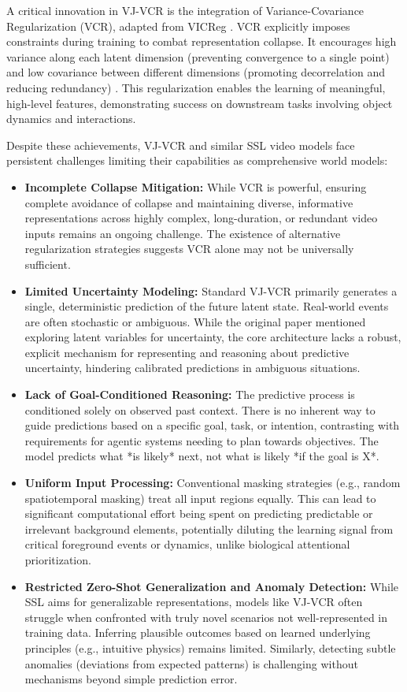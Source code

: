 \documentclass[11pt]{article}
\begin{document}
A critical innovation in VJ-VCR is the integration of Variance-Covariance Regularization (VCR), adapted from VICReg \cite{Bardes2021}. VCR explicitly imposes constraints during training to combat representation collapse. It encourages high variance along each latent dimension (preventing convergence to a single point) and low covariance between different dimensions (promoting decorrelation and reducing redundancy) \cite{Bardes2022, Zhu2023}. This regularization enables the learning of meaningful, high-level features, demonstrating success on downstream tasks involving object dynamics and interactions.

Despite these achievements, VJ-VCR and similar SSL video models face persistent challenges limiting their capabilities as comprehensive world models:
\begin{itemize}
    \item \textbf{Incomplete Collapse Mitigation:} While VCR is powerful, ensuring complete avoidance of collapse and maintaining diverse, informative representations across highly complex, long-duration, or redundant video inputs remains an ongoing challenge. The existence of alternative regularization strategies suggests VCR alone may not be universally sufficient.
    \item \textbf{Limited Uncertainty Modeling:} Standard VJ-VCR primarily generates a single, deterministic prediction of the future latent state. Real-world events are often stochastic or ambiguous. While the original paper mentioned exploring latent variables for uncertainty, the core architecture lacks a robust, explicit mechanism for representing and reasoning about predictive uncertainty, hindering calibrated predictions in ambiguous situations.
    \item \textbf{Lack of Goal-Conditioned Reasoning:} The predictive process is conditioned solely on observed past context. There is no inherent way to guide predictions based on a specific goal, task, or intention, contrasting with requirements for agentic systems needing to plan towards objectives. The model predicts what *is likely* next, not what is likely *if the goal is X*.
    \item \textbf{Uniform Input Processing:} Conventional masking strategies (e.g., random spatiotemporal masking) treat all input regions equally. This can lead to significant computational effort being spent on predicting predictable or irrelevant background elements, potentially diluting the learning signal from critical foreground events or dynamics, unlike biological attentional prioritization.
    \item \textbf{Restricted Zero-Shot Generalization and Anomaly Detection:} While SSL aims for generalizable representations, models like VJ-VCR often struggle when confronted with truly novel scenarios not well-represented in training data. Inferring plausible outcomes based on learned underlying principles (e.g., intuitive physics) remains limited. Similarly, detecting subtle anomalies (deviations from expected patterns) is challenging without mechanisms beyond simple prediction error.
\end{itemize}
\end{document}
